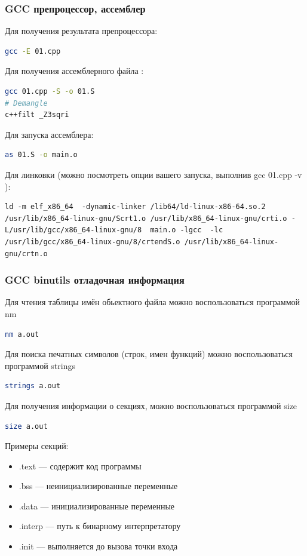 \documentclass[10pt,fullscreen=true, bookmarks=false]{beamer}
\begin{document}
\begin{frame}[fragile]
\frametitle{GCC препроцессор, ассемблер}

Для получения результата препроцессора:
\begin{lstlisting}[language=bash]
gcc -E 01.cpp
\end{lstlisting}

Для получения ассемблерного файла :
\begin{lstlisting}[language=bash]
gcc 01.cpp -S -o 01.S
# Demangle
c++filt _Z3sqri
\end{lstlisting}

Для запуска ассемблера:
\begin{lstlisting}[language=bash]
as 01.S -o main.o
\end{lstlisting}

Для линковки (можно посмотреть опции вашего запуска, выполнив gcc 01.cpp -v ):

\begin{lstlisting}[breaklines]
ld -m elf_x86_64  -dynamic-linker /lib64/ld-linux-x86-64.so.2  /usr/lib/x86_64-linux-gnu/Scrt1.o /usr/lib/x86_64-linux-gnu/crti.o -L/usr/lib/gcc/x86_64-linux-gnu/8  main.o -lgcc  -lc /usr/lib/gcc/x86_64-linux-gnu/8/crtendS.o /usr/lib/x86_64-linux-gnu/crtn.o
\end{lstlisting}

\tableofcontents[pausesections]
\end{frame}


\begin{frame}[fragile]
\frametitle{GCC binutils отладочная информация}

Для чтения таблицы имён обьектного файла можно воспользоваться программой nm
\begin{lstlisting}[language=bash]
nm a.out
\end{lstlisting}

Для поиска печатных символов (строк, имен функций) можно воспользоваться программой strings
\begin{lstlisting}[language=bash]
strings a.out
\end{lstlisting}

Для получения информации о секциях, можно воспользоваться программой size
\begin{lstlisting}[language=bash]
size a.out
\end{lstlisting}

Примеры секций:
\begin{itemize}
    \item .text — содержит код программы
    \item .bss — неинициализированные переменные
    \item .data — инициализированные переменные
    \item .interp — путь к бинарному интерпретатору
    \item .init — выполняется до вызова точки входа
\end{itemize}

\tableofcontents[pausesections]
\end{frame}
\end{document}
